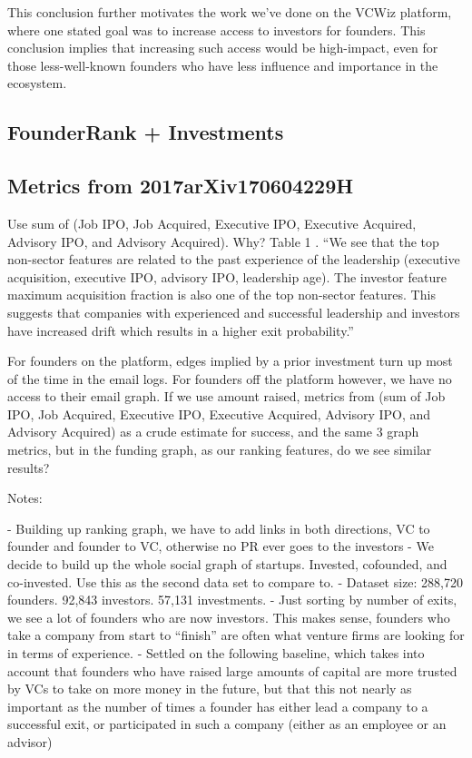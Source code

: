 This conclusion further motivates the work we've done on the VCWiz platform, where one stated goal was to increase access to investors for founders. This conclusion implies that increasing such access would be high-impact, even for those less-well-known founders who have less influence and importance in the ecosystem.

\subsection{FounderRank + Investments}

\subsection{Metrics from 2017arXiv170604229H}

Use sum of (Job IPO, Job Acquired, Executive IPO, Executive Acquired, Advisory IPO, and Advisory Acquired). Why? Table 1 \cite{2017arXiv170604229H}. ``We see that the top non-sector features are related to the past experience of the leadership (executive acquisition, executive IPO, advisory IPO, leadership age). The investor feature maximum acquisition fraction is also one of the top non-sector features. This suggests that companies with experienced and successful leadership and investors have increased drift which results in a higher exit probability.''


For founders on the platform, edges implied by a prior investment turn up most of the time in the email logs. For founders off the platform however, we have no access to their email graph. If we use amount raised, metrics from \cite{2017arXiv170604229H} (sum of Job IPO, Job Acquired, Executive IPO, Executive Acquired, Advisory IPO, and Advisory Acquired) as a crude estimate for success, and the same 3 graph metrics, but in the funding graph, as our ranking features, do we see similar results?

Notes:

- Building up ranking graph, we have to add links in both directions, VC to founder and founder to VC, otherwise no PR ever goes to the investors
- We decide to build up the whole social graph of startups. Invested, cofounded, and co-invested. Use this as the second data set to compare to.
- Dataset size: 288,720 founders. 92,843 investors. 57,131 investments.
- Just sorting by number of exits, we see a lot of founders who are now investors. This makes sense, founders who take a company from start to ``finish'' are often what venture firms are looking for in terms of experience.
- Settled on the following baseline, which takes into account that founders who have raised large amounts of capital are more trusted by VCs to take on more money in the future, but that this not nearly as important as the number of times a founder has either lead a company to a successful exit, or participated in such a company (either as an employee or an advisor)

